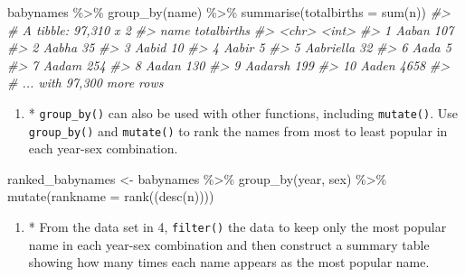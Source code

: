 \documentclass[
]{book}
\newenvironment{Shaded}{\begin{snugshade}}{\end{snugshade}}
\newcommand{\AttributeTok}[1]{\textcolor[rgb]{0.77,0.63,0.00}{#1}}
\newcommand{\CommentTok}[1]{\textcolor[rgb]{0.56,0.35,0.01}{\textit{#1}}}
\newcommand{\FunctionTok}[1]{\textcolor[rgb]{0.00,0.00,0.00}{#1}}
\newcommand{\NormalTok}[1]{#1}
\newcommand{\OtherTok}[1]{\textcolor[rgb]{0.56,0.35,0.01}{#1}}
\newcommand{\SpecialCharTok}[1]{\textcolor[rgb]{0.00,0.00,0.00}{#1}}
\providecommand{\tightlist}{%
  \setlength{\itemsep}{0pt}\setlength{\parskip}{0pt}}
\begin{document}
\begin{Shaded}
\begin{Highlighting}[]
\NormalTok{babynames }\SpecialCharTok{\%\textgreater{}\%} \FunctionTok{group\_by}\NormalTok{(name) }\SpecialCharTok{\%\textgreater{}\%}
  \FunctionTok{summarise}\NormalTok{(}\AttributeTok{totalbirths =} \FunctionTok{sum}\NormalTok{(n))}
\CommentTok{\#\textgreater{} \# A tibble: 97,310 x 2}
\CommentTok{\#\textgreater{}    name      totalbirths}
\CommentTok{\#\textgreater{}    \textless{}chr\textgreater{}           \textless{}int\textgreater{}}
\CommentTok{\#\textgreater{}  1 Aaban             107}
\CommentTok{\#\textgreater{}  2 Aabha              35}
\CommentTok{\#\textgreater{}  3 Aabid              10}
\CommentTok{\#\textgreater{}  4 Aabir               5}
\CommentTok{\#\textgreater{}  5 Aabriella          32}
\CommentTok{\#\textgreater{}  6 Aada                5}
\CommentTok{\#\textgreater{}  7 Aadam             254}
\CommentTok{\#\textgreater{}  8 Aadan             130}
\CommentTok{\#\textgreater{}  9 Aadarsh           199}
\CommentTok{\#\textgreater{} 10 Aaden            4658}
\CommentTok{\#\textgreater{} \# ... with 97,300 more rows}
\end{Highlighting}
\end{Shaded}

\begin{enumerate}
\def\labelenumi{\arabic{enumi}.}
\setcounter{enumi}{3}
\tightlist
\item
  * \texttt{group\_by()} can also be used with other functions, including \texttt{mutate()}. Use \texttt{group\_by()} and \texttt{mutate()} to rank the names from most to least popular in each year-sex combination.
\end{enumerate}

\begin{Shaded}
\begin{Highlighting}[]
\NormalTok{ranked\_babynames }\OtherTok{\textless{}{-}}\NormalTok{ babynames }\SpecialCharTok{\%\textgreater{}\%} \FunctionTok{group\_by}\NormalTok{(year, sex) }\SpecialCharTok{\%\textgreater{}\%}
  \FunctionTok{mutate}\NormalTok{(}\AttributeTok{rankname =} \FunctionTok{rank}\NormalTok{((}\FunctionTok{desc}\NormalTok{(n))))}
\end{Highlighting}
\end{Shaded}

\begin{enumerate}
\def\labelenumi{\arabic{enumi}.}
\setcounter{enumi}{4}
\tightlist
\item
  * From the data set in 4, \texttt{filter()} the data to keep only the most popular name in each year-sex combination and then construct a summary table showing how many times each name appears as the most popular name.
\end{enumerate}
\end{document}

